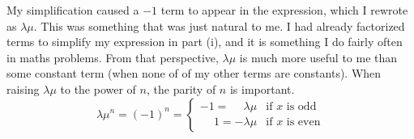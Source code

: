 \documentclass[12pt]{article}
\begin{document}
My simplification caused a $-1$ term to appear in the expression, which I rewrote as $\lambda\mu$.
This was something that was just natural to me.
I had already factorized terms to simplify my expression in part (i), and it is something I do fairly often in maths problems.
From that perspective, $\lambda\mu$ is much more useful to me than some constant term (when none of of my other terms are constants).
When raising $\lambda\mu$ to the power of $n$, the parity of $n$ is important.
\begin{equation}
    \lambda\mu^n = (-1)^n =
    \begin{cases}
        -1 = \phantom{-} \lambda\mu  & \text{if } x \text{ is odd}  \\
        \phantom{-}1  =  -\lambda\mu & \text{if } x \text{ is even}
    \end{cases}
\end{equation}
\end{document}
